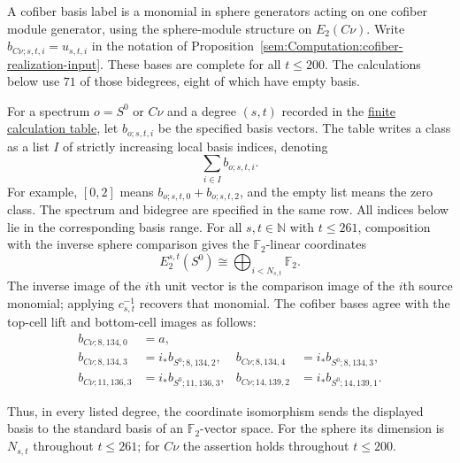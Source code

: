 \begin{theorem}
\label{sem:Computation:table-bases}
A cofiber basis label is a monomial in sphere generators acting on one
cofiber module generator, using the sphere-module structure on
$E_2(C\nu)$. Write $b_{C\nu;s,t,i}=u_{s,t,i}$ in the notation of
Proposition~\ref{sem:Computation:cofiber-realization-input}.
These bases are complete for all $t\leq200$. The calculations below use
$71$ of those bidegrees, eight of which have empty basis.

For a spectrum $o=S^0$ or $C\nu$ and a degree $(s,t)$ recorded in the
\href{paper/finite-calculations.html}{finite calculation table}, let
$b_{o;s,t,i}$ be the specified basis vectors. The table writes a class
as a list $I$ of strictly increasing local basis indices, denoting
\[
\sum_{i\in I}b_{o;s,t,i}.
\]
For example, $[0,2]$ means $b_{o;s,t,0}+b_{o;s,t,2}$, and the empty
list means the zero class. The spectrum and bidegree are specified in
the same row. All indices below lie in the corresponding basis range.
For all $s,t\in\mathbb N$ with $t\leq261$, composition with the inverse
sphere comparison gives the $\mathbb F_2$-linear coordinates
\[
E_2^{s,t}(S^0)\cong\bigoplus_{i<N_{s,t}}\mathbb F_2.
\]
The inverse image of the $i$th unit vector is the comparison image
of the $i$th source monomial; applying $c_{s,t}^{-1}$ recovers that
monomial.
The cofiber bases agree with the top-cell lift and bottom-cell images
as follows:
\[
\begin{aligned}
b_{C\nu;8,134,0}&=a,\\
b_{C\nu;8,134,3}&=i_*b_{S^0;8,134,2},&
b_{C\nu;8,134,4}&=i_*b_{S^0;8,134,3},\\
b_{C\nu;11,136,3}&=i_*b_{S^0;11,136,3},&
b_{C\nu;14,139,2}&=i_*b_{S^0;14,139,1}.
\end{aligned}
\]

Thus, in every listed degree, the coordinate isomorphism sends the
displayed basis to the standard basis of an $\mathbb F_2$-vector
space. For the sphere its dimension is $N_{s,t}$ throughout
$t\leq261$; for $C\nu$ the assertion holds throughout $t\leq200$.
\end{theorem}
